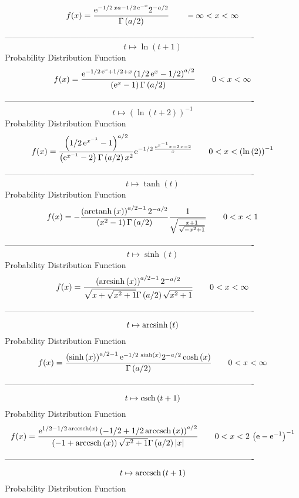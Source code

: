 \documentclass[12pt]{article}
\begin{document}
$$  f(x)={\frac {{{\rm e}^{-1/2\,xa-1/2\,{{\rm e}^{-x}}}}{2}^{-a/2}}{\Gamma
 \left( a/2 \right) }}
 \qquad-\infty 
 < x < \infty 
$$-------------------------------------------------------------------------------------------  \\$$t\mapsto \ln  \left( t+1 \right) 
$$Probability Distribution Function 
$$  f(x)={\frac {{{\rm e}^{-1/2\,{{\rm e}^{x}}+1/2+x}} \left( 1/2\,{{\rm e}^{x}
}-1/2 \right) ^{a/2}}{ \left( {{\rm e}^{x}}-1 \right) \Gamma \left( a/
2 \right) }}
 \qquad0
 < x < \infty 
$$-------------------------------------------------------------------------------------------  \\$$t\mapsto  \left( \ln  \left( t+2 \right)  \right) ^{-1}
$$Probability Distribution Function 
$$  f(x)={\frac { \left( 1/2\,{{\rm e}^{{x}^{-1}}}-1 \right) ^{a/2}}{ \left( {
{\rm e}^{{x}^{-1}}}-2 \right) \Gamma \left( a/2 \right) {x}^{2}}{
{\rm e}^{-1/2\,{\frac {{{\rm e}^{{x}^{-1}}}x-2\,x-2}{x}}}}}
 \qquad0
 < x <  \left( \ln  \left( 2 \right)  \right) ^{-1}
$$-------------------------------------------------------------------------------------------  \\$$t\mapsto \tanh \left( t \right) 
$$Probability Distribution Function 
$$  f(x)=-{\frac { \left( {\rm arctanh} \left(x\right) \right) ^{a/2-1}{2}^{-a/
2}}{ \left( {x}^{2}-1 \right) \Gamma \left( a/2 \right) }{\frac {1}{
\sqrt {{\frac {x+1}{\sqrt {-{x}^{2}+1}}}}}}}
 \qquad0
 < x < 1
$$-------------------------------------------------------------------------------------------  \\$$t\mapsto \sinh \left( t \right) 
$$Probability Distribution Function 
$$  f(x)={\frac { \left( {\rm arcsinh} \left(x\right) \right) ^{a/2-1}{2}^{-a/2
}}{\sqrt {x+\sqrt {{x}^{2}+1}}\Gamma \left( a/2 \right) \sqrt {{x}^{2}
+1}}}
 \qquad0
 < x < \infty 
$$-------------------------------------------------------------------------------------------  \\$$t\mapsto {\rm arcsinh} \left(t\right)
$$Probability Distribution Function 
$$  f(x)={\frac { \left( \sinh \left( x \right)  \right) ^{a/2-1}{{\rm e}^{-1/2
\,\sinh \left( x \right) }}{2}^{-a/2}\cosh \left( x \right) }{\Gamma
 \left( a/2 \right) }}
 \qquad0
 < x < \infty 
$$-------------------------------------------------------------------------------------------  \\$$t\mapsto {\rm csch} \left(t+1\right)
$$Probability Distribution Function 
$$  f(x)={\frac {{{\rm e}^{1/2-1/2\,{\rm arccsch} \left(x\right)}} \left( -1/2+
1/2\,{\rm arccsch} \left(x\right) \right) ^{a/2}}{ \left( -1+
{\rm arccsch} \left(x\right) \right) \sqrt {{x}^{2}+1}\Gamma \left( a/
2 \right)  \left| x \right| }}
 \qquad0
 < x < 2\, \left( {\rm e}-{{\rm e}^{-1}} \right) ^{-1}
$$-------------------------------------------------------------------------------------------  \\$$t\mapsto {\rm arccsch} \left(t+1\right)
$$Probability Distribution Function 
\end{document}
